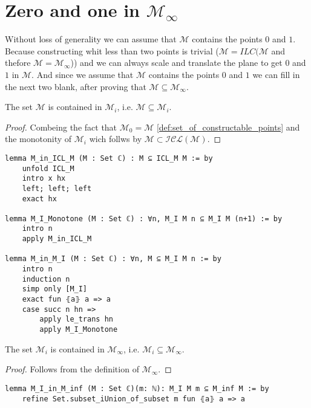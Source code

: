 \section{Zero and one in $\mathcal{M}_{\infty}$}
Without loss of generality we can assume that $\mathcal{M}$ contains the points $0$ and $1$.
Because constructing whit less than two points is trivial ($\mathcal{M}=ILC(\mathcal{M}$ and thefore $\mathcal{M}=\mathcal{M}_{\infty}$)) and we can always scale and translate the plane to get $0$ and $1$ in $\mathcal{M}$.
And since we assume that $\mathcal{M}$ contains the points $0$ and $1$ we can fill in the next two blank, 
after proving that $\mathcal{M} \subseteq \mathcal{M}_{\infty}$.

\begin{lemma}
    \label{lem:M_in_Mi}
    The set $\mathcal{M}$ is contained in $\mathcal{M}_i$, i.e. $\mathcal{M} \subseteq \mathcal{M}_i$.
\end{lemma}
\begin{proof}
    Combeing the fact that $\mathcal{M}_0 = \mathcal{M}$ \ref{def:set_of_constructable_points} and the monotonity of $\mathcal{M}_i$ wich follws by $\mathcal{M} \subset \mathcal{ICL(M)}$.
\end{proof}

\begin{lstlisting}
lemma M_in_ICL_M (M : Set ℂ) : M ⊆ ICL_M M := by
    unfold ICL_M
    intro x hx 
    left; left; left
    exact hx

lemma M_I_Monotone (M : Set ℂ) : ∀n, M_I M n ⊆ M_I M (n+1) := by
    intro n
    apply M_in_ICL_M

lemma M_in_M_I (M : Set ℂ) : ∀n, M ⊆ M_I M n := by
    intro n
    induction n
    simp only [M_I]
    exact fun ⦃a⦄ a => a
    case succ n hn =>
        apply le_trans hn
        apply M_I_Monotone
\end{lstlisting}

\begin{lemma}
    The set $\mathcal{M}_i$ is contained in $\mathcal{M}_{\infty}$, i.e. $\mathcal{M}_i \subseteq \mathcal{M}_{\infty}$.
\end{lemma}

\begin{proof}
    Follows from the definition of $\mathcal{M}_{\infty}$.
\end{proof}

\begin{lstlisting}
lemma M_I_in_M_inf (M : Set ℂ)(m: ℕ): M_I M m ⊆ M_inf M := by
    refine Set.subset_iUnion_of_subset m fun ⦃a⦄ a => a
\end{lstlisting}

